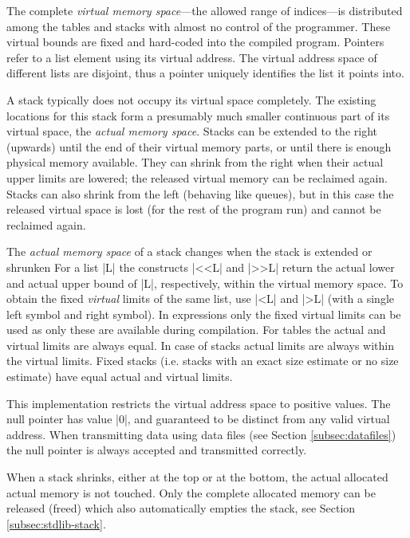 \documentclass[titlepage]{article}
\newcommand\g[1]{\textsf{\color{blue!90!black}#1}}
\begin{document}
The complete \emph{virtual memory space}---the allowed range of indices---is
distributed among the tables and stacks with almost no control of the
programmer. These virtual bounds are fixed and hard-coded into the compiled
program. Pointers refer to a list element using its virtual address.
The virtual address space of different lists are disjoint, thus a
pointer uniquely identifies the list it points into.

A \g{stack} typically does not occupy its virtual space completely. The existing
locations for this stack form a presumably much smaller continuous part of
its virtual space, the \emph{actual memory space}. Stacks can be
extended to the right (upwards) until the end of their virtual memory parts,
or until there is enough physical memory available. They can shrink from the
right when their actual upper limits are lowered; the released virtual
memory can be reclaimed again. Stacks can also shrink from the left
(behaving like queues), but in this case the released virtual space is lost
(for the rest of the program run) and cannot be reclaimed again.

The \emph{actual memory space} of a \g{stack} changes when the stack is
extended or shrunken For a list \pp|L| the constructs \pp|<<L| and \pp|>>L|
return the actual lower and actual upper bound of \pp|L|, respectively,
within the virtual memory space. To obtain the fixed \emph{virtual} limits
of the same list, use \pp|<L| and \pp|>L| (with a single \g{left symbol} and
\g{right symbol}). In expressions only the fixed virtual limits can be used
as only these are available during compilation.
%
For \g{table}s the actual and virtual limits are always equal. In case of
\g{stack}s actual limits are always within the virtual limits. Fixed stacks
(i.e. stacks with an exact size estimate or no size estimate) have
equal actual and virtual limits.

This implementation restricts the virtual address space to positive values.
The null pointer has value
\pp|0|, and guaranteed to be distinct from any valid virtual address.
When transmitting data using data files (see Section \ref{subsec:datafiles})
the null pointer is always accepted and transmitted correctly.

When a \g{stack} shrinks, either at the top or at the bottom, the actual
allocated actual memory is not touched. Only the complete allocated memory
can be released (freed) which also automatically empties the stack, see
Section \ref{subsec:stdlib-stack}.

\end{document}
